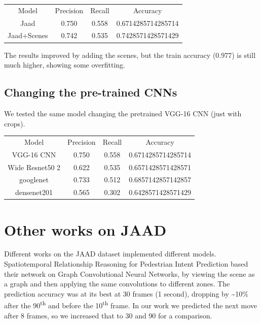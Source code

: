 \documentclass[11pt]{article}
\begin{document}
    \begin{center}
    \begin{tabular}{| c c c c |}\hline
     Model & Precision & Recall & Accuracy\\
     Jaad & 0.750 & 0.558 & 0.6714285714285714 \\
     Jaad+Scenes & 0.742 & 0.535 & 0.7428571428571429\\\hline
    \end{tabular}
    \end{center}

    The results improved by adding the scenes, but the train accuracy (0.977) is still much higher, showing some overfitting.


    \subsection*{Changing the pre-trained CNNs}
    We tested the same model changing the pretrained VGG-16 CNN (just with crops).


    \begin{center}
    \begin{tabular}{| c c c c |}\hline
        Model           & Precision & Recall & Accuracy\\
        VGG-16 CNN      & 0.750     & 0.558  & 0.6714285714285714 \\
        Wide Resnet50 2 & 0.622     & 0.535  & 0.6571428571428571 \\
        googlenet       & 0.733     & 0.512  & 0.6857142857142857 \\
        densenet201     & 0.565     & 0.302  & 0.6428571428571429 \\\hline



    \end{tabular}
    \end{center}

\section{Other works on JAAD}
Different works on the JAAD dataset implemented different models.
Spatiotemporal Relationship Reasoning for Pedestrian Intent Prediction\cite{liu2020spatiotemporal} based their network on
Graph Convolutional Neural Networks\cite{GCNN}, by viewing the scene as a graph and then applying the same convolutions
to different zones.
The prediction accuracy was at its best at 30 frames (1 second), dropping by \textasciitilde 10\% after the 90\textsuperscript{th} and
before the 10\textsuperscript{th} frame.
In our work we predicted the next move after 8 frames, so we increased that to 30 and 90 for a comparison.
\end{document}
